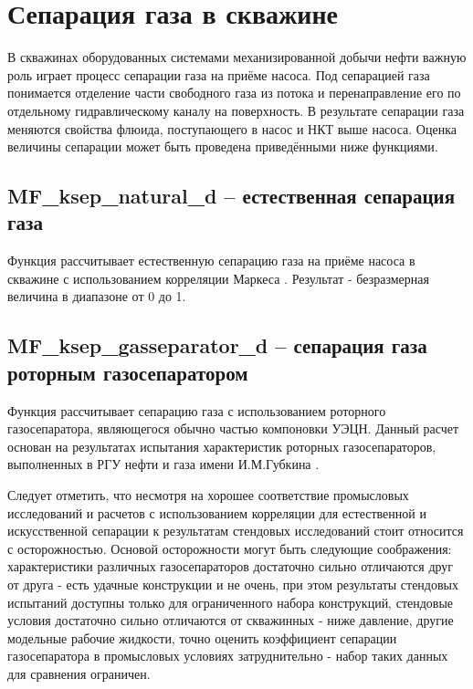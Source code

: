 \section{Сепарация газа в скважине}

В скважинах оборудованных системами механизированной добычи нефти важную роль играет процесс сепарации газа на приёме насоса. Под сепарацией газа понимается отделение части свободного газа из потока и перенаправление его по отдельному гидравлическому каналу на поверхность. В результате сепарации газа меняются свойства флюида, поступающего в насос и НКТ выше насоса. Оценка величины сепарации может быть проведена приведёнными ниже функциями.

\subsection{MF\_ksep\_natural\_d – естественная сепарация газа}

Функция рассчитывает естественную сепарацию газа на приёме насоса в скважине с использованием корреляции Маркеса \cite{Marquez_2003} . Результат - безразмерная величина в диапазоне от 0 до 1. 



\subsection{MF\_ksep\_gasseparator\_d – сепарация газа роторным газосепаратором}

Функция рассчитывает сепарацию газа с использованием роторного газосепаратора, являющегося обычно частью компоновки УЭЦН. Данный расчет основан на результатах испытания характеристик роторных газосепараторов, выполненных в РГУ нефти и газа имени И.М.Губкина \cite{SPE_117415_2008}. 

Следует отметить, что несмотря на хорошее соответствие промысловых исследований и расчетов с использованием корреляции для естественной и искусственной сепарации \cite{SPE_117415_2008} к результатам стендовых исследований стоит относится с осторожностью. Основой осторожности могут быть следующие соображения: характеристики различных газосепараторов достаточно сильно отличаются друг от друга - есть удачные конструкции и не очень, при этом результаты стендовых испытаний доступны только для ограниченного набора конструкций, стендовые условия достаточно сильно отличаются от скважинных - ниже давление, другие модельные рабочие жидкости, точно оценить коэффициент сепарации газосепаратора в промысловых условиях затруднительно - набор таких данных для сравнения ограничен. 

